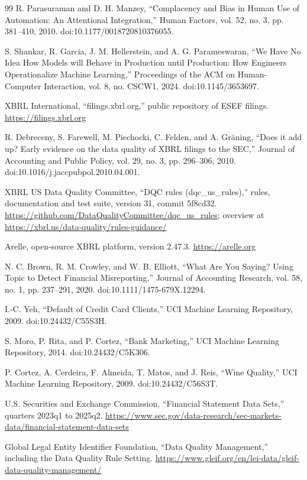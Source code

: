 \documentclass[11pt,a4paper]{article}
\begin{document}
\begin{thebibliography}{99}
 R. Parasuraman and D. H. Manzey, ``Complacency and Bias in Human Use of Automation: An Attentional Integration,'' Human Factors, vol. 52, no. 3, pp. 381--410, 2010. doi:10.1177/0018720810376055.

 S. Shankar, R. Garcia, J. M. Hellerstein, and A. G. Parameswaran, ``We Have No Idea How Models will Behave in Production until Production: How Engineers Operationalize Machine Learning,'' Proceedings of the ACM on Human-Computer Interaction, vol. 8, no. CSCW1, 2024. doi:10.1145/3653697.

 XBRL International, ``filings.xbrl.org,'' public repository of ESEF filings. \url{https://filings.xbrl.org}

 R. Debreceny, S. Farewell, M. Piechocki, C. Felden, and A. Gr\"aning, ``Does it add up? Early evidence on the data quality of XBRL filings to the SEC,'' Journal of Accounting and Public Policy, vol. 29, no. 3, pp. 296--306, 2010. doi:10.1016/j.jaccpubpol.2010.04.001.

 XBRL US Data Quality Committee, ``DQC rules (dqc\_us\_rules),'' rules, documentation and test suite, version 31, commit 5f8cd32. \url{https://github.com/DataQualityCommittee/dqc_us_rules}; overview at \url{https://xbrl.us/data-quality/rules-guidance/}

 Arelle, open-source XBRL platform, version 2.47.3. \url{https://arelle.org}

 N. C. Brown, R. M. Crowley, and W. B. Elliott, ``What Are You Saying? Using Topic to Detect Financial Misreporting,'' Journal of Accounting Research, vol. 58, no. 1, pp. 237--291, 2020. doi:10.1111/1475-679X.12294.

 I.-C. Yeh, ``Default of Credit Card Clients,'' UCI Machine Learning Repository, 2009. doi:10.24432/C55S3H.

 S. Moro, P. Rita, and P. Cortez, ``Bank Marketing,'' UCI Machine Learning Repository, 2014. doi:10.24432/C5K306.

 P. Cortez, A. Cerdeira, F. Almeida, T. Matos, and J. Reis, ``Wine Quality,'' UCI Machine Learning Repository, 2009. doi:10.24432/C56S3T.

 U.S. Securities and Exchange Commission, ``Financial Statement Data Sets,'' quarters 2023q1 to 2025q2. \url{https://www.sec.gov/data-research/sec-markets-data/financial-statement-data-sets}

 Global Legal Entity Identifier Foundation, ``Data Quality Management,'' including the Data Quality Rule Setting. \url{https://www.gleif.org/en/lei-data/gleif-data-quality-management/}


\end{thebibliography}
\end{document}
